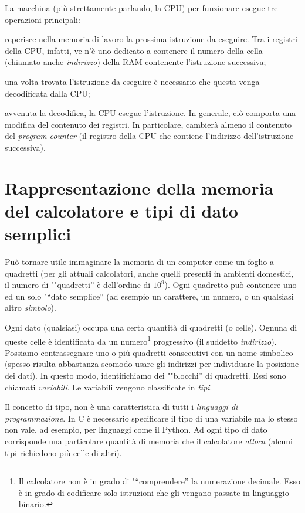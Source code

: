La  macchina (più strettamente parlando, la CPU) per funzionare esegue tre operazioni principali:
\begin{description}[]
	\item
[Fetch;] reperisce nella memoria di lavoro la prossima istruzione da eseguire. Tra i registri della CPU, infatti, ve n'è uno dedicato a contenere il numero della cella (chiamato anche \emph{indirizzo}) della RAM contenente l'istruzione successiva;
	\item
[Decode;] una volta trovata l'istruzione da eseguire è necessario che questa venga decodificata dalla CPU;
	\item
[Execute;] avvenuta la decodifica, la CPU esegue l'istruzione. In generale, ciò comporta una modifica del contenuto dei registri. In particolare, cambierà almeno il contenuto del \emph{program counter} (il registro della CPU che contiene l'indirizzo dell'istruzione successiva).
\end{description}

	\section{Rappresentazione della memoria del calcolatore e tipi di dato semplici}
	\label{sec:mem}
Può tornare utile immaginare la memoria di un computer come un foglio a quadretti (per gli attuali calcolatori, anche quelli presenti in ambienti domestici, il numero di ""quadretti'' è dell'ordine di $10^9$). Ogni quadretto può contenere uno ed un solo "“dato semplice'' (ad esempio un carattere, un numero, o un qualsiasi altro \emph{simbolo}).

Ogni dato (qualsiasi) occupa una certa quantità di quadretti (o celle). Ognuna di queste celle è identificata da un numero\footnote{Il calcolatore non è in grado di "“comprendere'' la numerazione decimale. Esso è in grado di codificare solo istruzioni che gli vengano passate in linguaggio binario.} progressivo (il suddetto \emph{indirizzo}). Possiamo contrassegnare uno o più quadretti consecutivi con un nome simbolico (spesso risulta abbastanza scomodo usare gli indirizzi per individuare la posizione dei dati). In questo modo, identifichiamo dei ""blocchi'' di quadretti. Essi  sono chiamati \emph{variabili}. Le variabili vengono classificate in \emph{tipi}.

Il concetto di tipo, non è una caratteristica di tutti i \emph{linguaggi di programmazione}. In C è necessario specificare il tipo di una variabile ma lo stesso non vale, ad esempio, per linguaggi come il Python. Ad ogni tipo di dato corrisponde una particolare quantità di memoria che il calcolatore \emph{alloca} (alcuni tipi richiedono più celle di altri).

